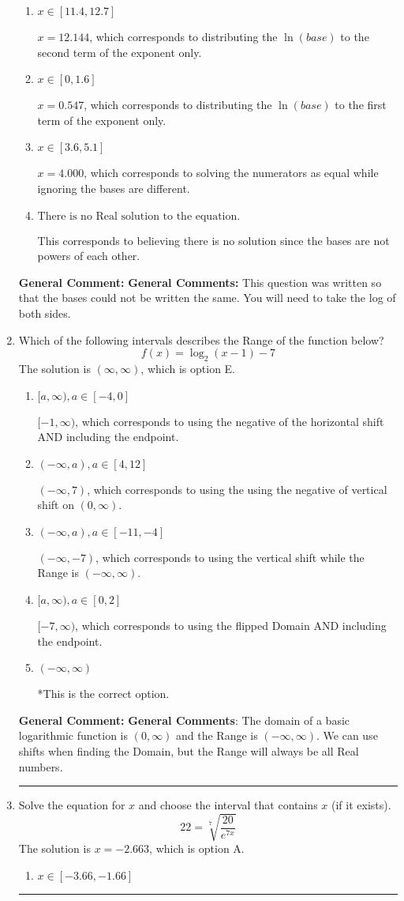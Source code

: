 \documentclass{extbook}[14pt]
\newcommand{\litem}[1]{\item #1

\rule{\textwidth}{0.4pt}}
\begin{document}
\begin{enumerate}
{\begin{enumerate}[label=\Alph*.]
* $x = 1.660$, which is the correct option.
\item \( x \in [11.4, 12.7] \)

$x = 12.144$, which corresponds to distributing the $\ln(base)$ to the second term of the exponent only.
\item \( x \in [0, 1.6] \)

$x = 0.547$, which corresponds to distributing the $\ln(base)$ to the first term of the exponent only.
\item \( x \in [3.6, 5.1] \)

$x = 4.000$, which corresponds to solving the numerators as equal while ignoring the bases are different.
\item \( \text{There is no Real solution to the equation.} \)

This corresponds to believing there is no solution since the bases are not powers of each other.
\end{enumerate}

\textbf{General Comment:} \textbf{General Comments:} This question was written so that the bases could not be written the same. You will need to take the log of both sides.
}
\litem{
Which of the following intervals describes the Range of the function below?
\[ f(x) = \log_2{(x-1)}-7 \]The solution is \( (\infty, \infty) \), which is option E.\begin{enumerate}[label=\Alph*.]
\item \( [a, \infty), a \in [-4, 0] \)

$[-1, \infty)$, which corresponds to using the negative of the horizontal shift AND including the endpoint.
\item \( (-\infty, a), a \in [4, 12] \)

$(-\infty, 7)$, which corresponds to using the using the negative of vertical shift on $(0, \infty)$.
\item \( (-\infty, a), a \in [-11, -4] \)

$(-\infty, -7)$, which corresponds to using the vertical shift while the Range is $(-\infty, \infty)$.
\item \( [a, \infty), a \in [0, 2] \)

$[-7, \infty)$, which corresponds to using the flipped Domain AND including the endpoint.
\item \( (-\infty, \infty) \)

*This is the correct option.
\end{enumerate}

\textbf{General Comment:} \textbf{General Comments}: The domain of a basic logarithmic function is $(0, \infty)$ and the Range is $(-\infty, \infty)$. We can use shifts when finding the Domain, but the Range will always be all Real numbers.
}
\litem{
 Solve the equation for $x$ and choose the interval that contains $x$ (if it exists).
\[  22 = \sqrt[7]{\frac{20}{e^{7x}}} \]The solution is \( x = -2.663 \), which is option A.\begin{enumerate}[label=\Alph*.]
\item \( x \in [-3.66, -1.66] \)


\end{enumerate}}
\end{enumerate}
\end{document}
